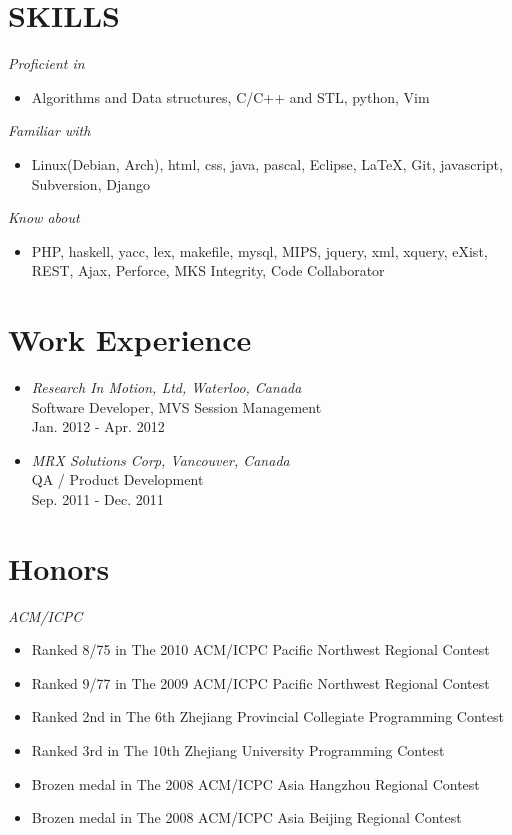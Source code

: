 \documentclass[line,margin]{res}
\begin{document}
\address{909-16 Cedarwoods Cres. Kitchener, ON, Canada  N2C 2L4}
\address{+1-519-404-7619 (Present - End of April 2012) or +1-778-862-3661 \\zmin@sfu.ca}
\begin{resume}
\section{SKILLS} 
	{\sl Proficient in } 
						\begin{itemize}
						\item Algorithms and Data structures, C/C++ and STL, python, Vim
						\end{itemize}
    {\sl Familiar with }
						\begin{itemize}
						\item Linux(Debian, Arch), html, css, java, pascal, Eclipse, \LaTeX, Git, javascript, Subversion, Django
						\end{itemize}
 	{\sl Know about } 
					\begin{itemize}
					\item PHP, haskell, yacc, lex, makefile, mysql, MIPS, jquery, xml, xquery, eXist, REST, Ajax, Perforce, MKS Integrity, Code Collaborator
					\end{itemize}

\section{Work Experience}
\begin{itemize}
\item {\sl Research In Motion, Ltd, Waterloo, Canada}\\
 Software Developer, MVS Session Management \\
Jan. 2012 - Apr. 2012
\item {\sl MRX Solutions Corp, Vancouver, Canada}\\
 QA / Product Development \\
Sep. 2011 - Dec. 2011
\end{itemize}


\section{Honors}
{\sl ACM/ICPC}
\begin{itemize}
\item Ranked 8/75 in The 2010 ACM/ICPC Pacific Northwest Regional Contest	
\item Ranked 9/77 in The 2009 ACM/ICPC Pacific Northwest Regional Contest	
\item Ranked 2nd in The 6th Zhejiang Provincial Collegiate Programming Contest 
\item Ranked 3rd in The 10th Zhejiang University Programming Contest 
\item Brozen medal in The 2008 ACM/ICPC Asia Hangzhou Regional Contest 
\item Brozen medal in The 2008 ACM/ICPC Asia Beijing Regional Contest   


\end{itemize}
\end{resume}
\end{document}
